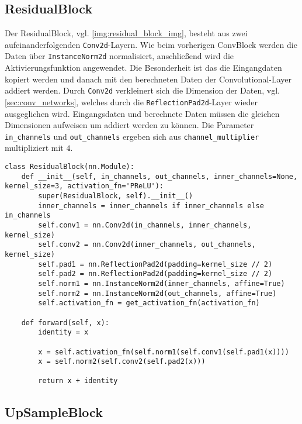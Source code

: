 \subsection{ResidualBlock}

Der ResidualBlock, vgl. \ref{img:residual_block_img}, besteht aus zwei aufeinanderfolgenden \texttt{Conv2d}-Layern. Wie beim vorherigen ConvBlock werden die Daten über \texttt{InstanceNorm2d} normalisiert, anschließend wird die Aktivierungsfunktion angewendet. Die Besonderheit ist das die Eingangdaten kopiert werden und danach mit den berechneten Daten der Convolutional-Layer addiert werden. Durch \texttt{Conv2d} verkleinert sich die Dimension der Daten, vgl. \ref{sec:conv_networks}, welches durch die \texttt{ReflectionPad2d}-Layer wieder ausgeglichen wird. Eingangsdaten und berechnete Daten müssen die gleichen Dimensionen aufweisen um addiert werden zu können. Die Parameter \texttt{in_channels} und \texttt{out_channels} ergeben sich aus \texttt{channel_multiplier} multipliziert mit $ 4 $.


\begin{listing}[ht]
\begin{verbatim}
class ResidualBlock(nn.Module):
    def __init__(self, in_channels, out_channels, inner_channels=None, kernel_size=3, activation_fn='PReLU'):
        super(ResidualBlock, self).__init__()
        inner_channels = inner_channels if inner_channels else in_channels
        self.conv1 = nn.Conv2d(in_channels, inner_channels, kernel_size)
        self.conv2 = nn.Conv2d(inner_channels, out_channels, kernel_size)
        self.pad1 = nn.ReflectionPad2d(padding=kernel_size // 2)
        self.pad2 = nn.ReflectionPad2d(padding=kernel_size // 2)
        self.norm1 = nn.InstanceNorm2d(inner_channels, affine=True)
        self.norm2 = nn.InstanceNorm2d(out_channels, affine=True)
        self.activation_fn = get_activation_fn(activation_fn)

    def forward(self, x):
        identity = x

        x = self.activation_fn(self.norm1(self.conv1(self.pad1(x))))
        x = self.norm2(self.conv2(self.pad2(x)))

        return x + identity
\end{verbatim}
\end{listing}

\subsection{UpSampleBlock}


